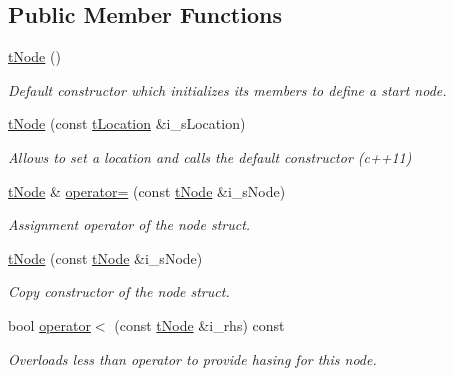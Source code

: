 \subsection*{Public Member Functions}
\begin{DoxyCompactItemize}
\item 
\mbox{\hyperlink{structplanner_1_1t_node_a83ff217ef060b93698045b2357999594}{t\+Node}} ()
\begin{DoxyCompactList}\small\item\em Default constructor which initializes its members to define a start node. \end{DoxyCompactList}\item 
\mbox{\label{structplanner_1_1t_node_a6728fd921145674d77dec553aad10824}} 
\mbox{\hyperlink{structplanner_1_1t_node_a6728fd921145674d77dec553aad10824}{t\+Node}} (const \mbox{\hyperlink{structplanner_1_1t_location}{t\+Location}} \&i\+\_\+s\+Location)
\begin{DoxyCompactList}\small\item\em Allows to set a location and calls the default constructor (c++11) \end{DoxyCompactList}\item 
\mbox{\label{structplanner_1_1t_node_abcbfb81ac371e43234f66072547af049}} 
\mbox{\hyperlink{structplanner_1_1t_node}{t\+Node}} \& \mbox{\hyperlink{structplanner_1_1t_node_abcbfb81ac371e43234f66072547af049}{operator=}} (const \mbox{\hyperlink{structplanner_1_1t_node}{t\+Node}} \&i\+\_\+s\+Node)
\begin{DoxyCompactList}\small\item\em Assignment operator of the node struct. \end{DoxyCompactList}\item 
\mbox{\label{structplanner_1_1t_node_a18891f54e73f974f1142fba95887de98}} 
\mbox{\hyperlink{structplanner_1_1t_node_a18891f54e73f974f1142fba95887de98}{t\+Node}} (const \mbox{\hyperlink{structplanner_1_1t_node}{t\+Node}} \&i\+\_\+s\+Node)
\begin{DoxyCompactList}\small\item\em Copy constructor of the node struct. \end{DoxyCompactList}\item 
bool \mbox{\hyperlink{structplanner_1_1t_node_a5085f3fcf4a960ed9fe14068f1b5e950}{operator$<$}} (const \mbox{\hyperlink{structplanner_1_1t_node}{t\+Node}} \&i\+\_\+rhs) const
\begin{DoxyCompactList}\small\item\em Overloads less than operator to provide hasing for this node. \end{DoxyCompactList}\end{DoxyCompactItemize}
